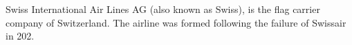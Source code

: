 Swiss International Air Lines AG (also known as Swiss), is the flag carrier company of Switzerland.
The airline was formed following the failure of Swissair in 202.
